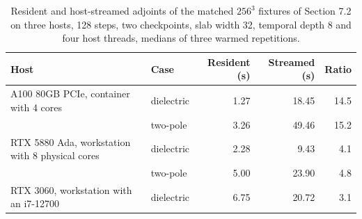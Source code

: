 \begin{table}[tbp]
\centering
\small
\renewcommand{\arraystretch}{1.15}
\caption{Resident and host-streamed adjoints of the matched $256^3$ fixtures of Section 7.2 on three hosts, 128 steps, two checkpoints, slab width 32, temporal depth 8 and four host threads, medians of three warmed repetitions.}
\label{tab:si-host}
\begin{tabular}{@{}llrrr@{}}
\toprule
Host & Case & Resident (s) & Streamed (s) & Ratio \\
\midrule
A100 80GB PCIe, container with 4 cores & dielectric & 1.27 & 18.45 & 14.5 \\
 & two-pole & 3.26 & 49.46 & 15.2 \\
RTX 5880 Ada, workstation with 8 physical cores & dielectric & 2.28 & 9.43 & 4.1 \\
 & two-pole & 5.00 & 23.90 & 4.8 \\
RTX 3060, workstation with an i7-12700 & dielectric & 6.75 & 20.72 & 3.1 \\
\bottomrule
\end{tabular}
\end{table}
